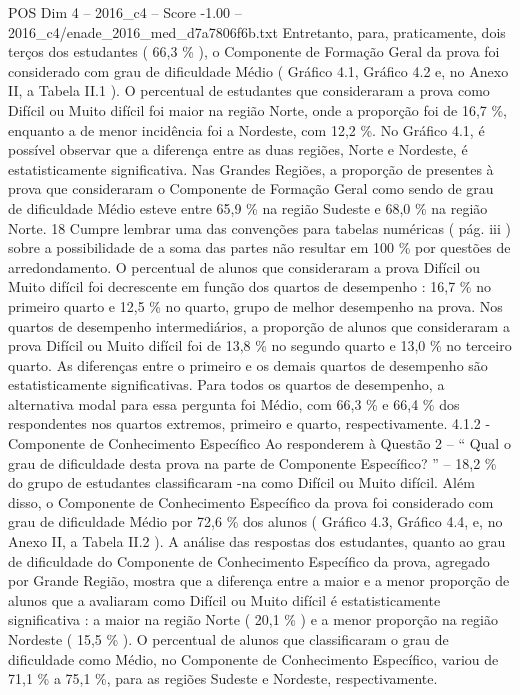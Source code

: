 \begin{textsample}{POS Dim 4 – 2016\_c4 – Score -1.00 – 2016\_c4/enade\_2016\_med\_d7a7806f6b.txt}
Entretanto, para, praticamente, dois terços dos estudantes ( 66,3 \% ), o Componente de Formação Geral da prova foi considerado com grau de dificuldade Médio ( Gráfico 4.1, Gráfico 4.2 e, no Anexo II, a Tabela II.1 ).
O percentual de estudantes que consideraram a prova como Difícil ou Muito difícil foi maior na região Norte, onde a proporção foi de 16,7 \%, enquanto a de menor incidência foi a Nordeste, com 12,2 \%.
No Gráfico 4.1, é possível observar que a diferença entre as duas regiões, Norte e Nordeste, é estatisticamente significativa.
Nas Grandes Regiões, a proporção de presentes à prova que consideraram o Componente de Formação Geral como sendo de grau de dificuldade Médio esteve entre 65,9 \% na região Sudeste e 68,0 \% na região Norte. 18 Cumpre lembrar uma das convenções para tabelas numéricas ( pág. iii ) sobre a possibilidade de a soma das partes não resultar em 100 \% por questões de arredondamento.
O percentual de alunos que consideraram a prova Difícil ou Muito difícil foi decrescente em função dos quartos de desempenho : 16,7 \% no primeiro quarto e 12,5 \% no quarto, grupo de melhor desempenho na prova.
Nos quartos de desempenho intermediários, a proporção de alunos que consideraram a prova Difícil ou Muito difícil foi de 13,8 \% no segundo quarto e 13,0 \% no terceiro quarto.
As diferenças entre o primeiro e os demais quartos de desempenho são estatisticamente significativas.
Para todos os quartos de desempenho, a alternativa modal para essa pergunta foi Médio, com 66,3 \% e 66,4 \% dos respondentes nos quartos extremos, primeiro e quarto, respectivamente. 4.1.2 - Componente de Conhecimento Específico Ao responderem à Questão 2 – “ Qual o grau de dificuldade desta prova na parte de Componente Específico? ” – 18,2 \% do grupo de estudantes classificaram -na como Difícil ou Muito difícil.
Além disso, o Componente de Conhecimento Específico da prova foi considerado com grau de dificuldade Médio por 72,6 \% dos alunos ( Gráfico 4.3, Gráfico 4.4, e, no Anexo II, a Tabela II.2 ).
A análise das respostas dos estudantes, quanto ao grau de dificuldade do Componente de Conhecimento Específico da prova, agregado por Grande Região, mostra que a diferença entre a maior e a menor proporção de alunos que a avaliaram como Difícil ou Muito difícil é estatisticamente significativa : a maior na região Norte ( 20,1 \% ) e a menor proporção na região Nordeste ( 15,5 \% ).
O percentual de alunos que classificaram o grau de dificuldade como Médio, no Componente de Conhecimento Específico, variou de 71,1 \% a 75,1 \%, para as regiões Sudeste e Nordeste, respectivamente.

\end{textsample}
